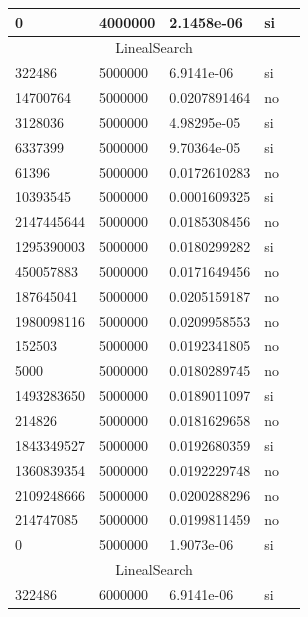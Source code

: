 \documentclass[12pt, fleqn]{article}                             %
\theoremstyle{break}                                            %
\begin{document}
\begin{longtable}{|m{5em}|m{5em}|m{10em}|m{5em}|@{}m{0pt}@{}}
            0& 4000000  & 2.1458e-06 & si &\\[1em]    \hline
            \multicolumn{5}{|c|}{LinealSearch}   \\          \hline
            322486& 5000000  & 6.9141e-06 & si &\\[1em]    \hline
            14700764& 5000000  & 0.0207891464 & no &\\[1em]    \hline
            3128036& 5000000  & 4.98295e-05 & si &\\[1em]    \hline
            6337399& 5000000  & 9.70364e-05 & si &\\[1em]    \hline
            61396& 5000000  & 0.0172610283 & no &\\[1em]    \hline
            10393545& 5000000  & 0.0001609325 & si &\\[1em]    \hline
            2147445644& 5000000  & 0.0185308456 & no &\\[1em]    \hline
            1295390003& 5000000  & 0.0180299282 & si &\\[1em]    \hline
            450057883& 5000000  & 0.0171649456 & no &\\[1em]    \hline
            187645041& 5000000  & 0.0205159187 & no &\\[1em]    \hline
            1980098116& 5000000  & 0.0209958553 & no &\\[1em]    \hline
            152503& 5000000  & 0.0192341805 & no &\\[1em]    \hline
            5000& 5000000  & 0.0180289745 & no &\\[1em]    \hline
            1493283650& 5000000  & 0.0189011097 & si &\\[1em]    \hline
            214826& 5000000  & 0.0181629658 & no &\\[1em]    \hline
            1843349527& 5000000  & 0.0192680359 & si &\\[1em]    \hline
            1360839354& 5000000  & 0.0192229748 & no &\\[1em]    \hline
            2109248666& 5000000  & 0.0200288296 & no &\\[1em]    \hline
            214747085& 5000000  & 0.0199811459 & no &\\[1em]    \hline
            0& 5000000  & 1.9073e-06 & si &\\[1em]    \hline
            \multicolumn{5}{|c|}{LinealSearch}   \\          \hline
            322486& 6000000  & 6.9141e-06 & si &\\[1em]    \hline

\end{longtable}
\end{document}
